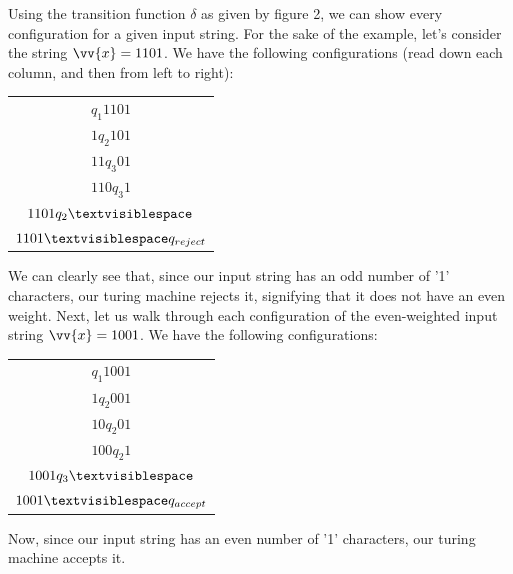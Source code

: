 \documentclass{article}
\begin{document}
\begin{exmp}
\begin{figure}[h]
\end{figure}
\noindent Using the transition function $\delta$ as given by figure 2, we can show every configuration for a given input string.  For the sake of the example, let's consider the string $\vv{x} = 1101$.  We have the following configurations (read down each column, and then from left to right):
\begin{center}
\begin{tabular}{ c }
	$q_{1}1101$ \\
	$1q_{2}101$ \\
	$11q_{3}01$ \\
	$110q_{3}1$ \\
	$1101q_{2} \textvisiblespace$ \\
	$1101 \textvisiblespace q_{reject}$
\end{tabular}
\end{center}
\noindent We can clearly see that, since our input string has an odd number of '1' characters, our turing machine rejects it, signifying that it does not have an even weight.  Next, let us walk through each configuration of the even-weighted input string $\vv{x} = 1001$.  We have the following configurations:
\begin{center}
\begin{tabular}{ c }
	$q_{1}1001$ \\
	$1q_{2}001$ \\
	$10q_{2}01$ \\
	$100q_{2}1$ \\
	$1001q_{3}\textvisiblespace$ \\
	$1001\textvisiblespace q_{accept}$
\end{tabular}
\end{center}
\end{exmp}
\noindent Now, since our input string has an even number of '1' characters, our turing machine accepts it. \cite{2}
\end{document}
